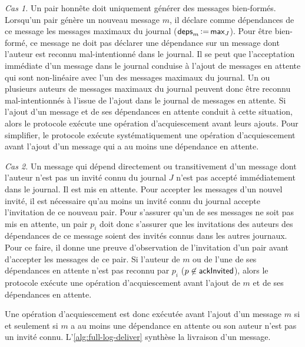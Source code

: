 \emph{Cas 1.} Un pair honnête doit uniquement générer des messages bien-formés.
Lorsqu'un pair génère un nouveau message $m$, il déclare comme dépendances de ce message les messages maximaux du journal ($\operatorname{\mathsf{deps}}_m \operatorname{\vcentcolon=} \operatorname{\mathsf{max}}_J$).
Pour être bien-formé, ce message ne doit pas déclarer une dépendance sur un message dont l'auteur est reconnu mal-intentionné dans le journal.
Il se peut que l'acceptation immédiate d'un message dans le journal conduise à l'ajout de messages en attente qui sont non-linéaire avec l'un des messages maximaux du journal.
Un ou plusieurs auteurs de messages maximaux du journal peuvent donc être reconnu mal-intentionnés à l'issue de l'ajout dans le journal de messages en attente.
Si l'ajout d'un message et de ses dépendances en attente conduit à cette situation, alors le protocole exécute une opération d'acquiescement avant leurs ajouts.
Pour simplifier, le protocole exécute systématiquement une opération d'acquiescement avant l'ajout d'un message qui a au moins une dépendance en attente.


\emph{Cas 2.} Un message qui dépend directement ou transitivement d'un message dont l'auteur n'est pas un invité connu du journal $J$ n'est pas accepté immédiatement dans le journal.
Il est mis en attente.
Pour accepter les messages d'un nouvel invité, il est nécessaire qu'au moins un invité connu du journal accepte l'invitation de ce nouveau pair.
Pour s'assurer qu'un de ses messages ne soit pas mis en attente, un pair $p_i$ doit donc s'assurer que les invitations des auteurs des dépendances de ce message soient des invités connus dans les autres journaux.
Pour ce faire, il donne une preuve d'observation de l'invitation d'un pair avant d'accepter les messages de ce pair.
Si l'auteur de $m$ ou de l'une de ses dépendances en attente n'est pas reconnu par $p_i$ ($p \not\in \operatorname{\mathsf{ackInvited}}$), alors le protocole exécute une opération d'acquiescement avant l'ajout de $m$ et de ses dépendances en attente.

Une opération d'acquiescement est donc exécutée avant l'ajout d'un message $m$ si et seulement si $m$ a au moins une dépendance en attente ou son auteur n'est pas un invité connu.
L'\autoref{alg:full-log-deliver} synthèse la livraison d'un message.

